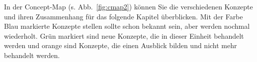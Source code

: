 In der Concept-Map (s. Abb.~\ref{fig:cmap2}) können Sie die verschiedenen Konzepte und ihren Zusammenhang für das folgende Kapitel überblicken. 
Mit der Farbe Blau markierte Konzepte stellen sollte schon bekannt sein, aber werden nochmal wiederholt.
Grün markiert sind neue Konzepte, die in dieser Einheit behandelt werden und orange sind Konzepte, die einen Ausblick bilden und nicht mehr behandelt werden. 

